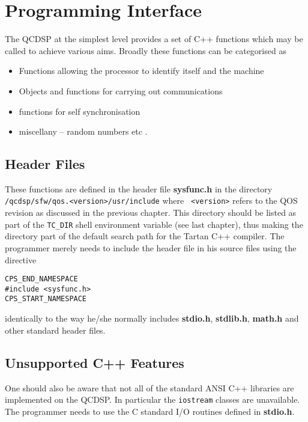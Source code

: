 \section{Programming Interface}
The QCDSP at the simplest level provides a set of C++ functions
which may be called to achieve various aims. Broadly these functions
can be categorised as
\begin{itemize}
\item
Functions allowing the processor to identify itself and the machine
\item
Objects and functions for carrying out communications
\item
functions for self synchronisation
\item
miscellany -- random numbers etc .
\end{itemize}

\subsection{Header Files}
These functions are defined in the header file {\bf sysfunc.h} in the
directory {\tt /qcdsp/sfw/qos.<version>/usr/include} where {\tt
<version>} refers to the QOS revision as discussed in the previous
chapter. This directory should be listed as part of the {\tt TC\_DIR}
shell environment variable (see last chapter), thus making the
directory part of the default search path for the Tartan C++
compiler. The programmer merely needs to include the header file in
his source files using the directive
\begin{verbatim}
CPS_END_NAMESPACE
#include <sysfunc.h>
CPS_START_NAMESPACE
\end{verbatim} 
identically to the way he/she normally includes {\bf stdio.h}, {\bf stdlib.h}, 
{\bf math.h} and other standard header files.

\subsection{Unsupported C++ Features}
One should also be aware that not all of the standard ANSI C++ libraries
are implemented on the QCDSP. In particular the {\tt iostream} classes
are unavailable. The programmer needs to use the C standard I/O routines
defined in {\bf stdio.h}.

